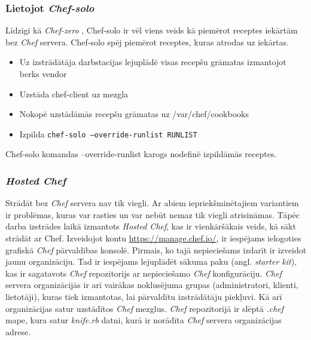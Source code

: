 \subsubsection{Lietojot \textit{Chef-solo}}
Līdzīgi kā \textit{Chef-zero} , Chef-solo ir vēl viens veids kā piemērot receptes iekārtām bez \textit{Chef} servera. Chef-solo spēj piemērot receptes, kuras atrodas uz iekārtas.
\begin{itemize}
	\item Uz izstrādātāja darbstacijas lejuplādē visas recepšu grāmatas izmantojot berks vendor
	\item Uzstāda chef-client uz mezgla
	\item Nokopē uzstādāmās recepšu grāmatas uz /var/chef/cookbooks
	\item Izpilda \texttt{chef-solo --override-runlist RUNLIST}
\end{itemize}
Chef-solo komandas --override-runlist karogs nodefinē izpildāmās receptes.

\subsubsection{\textit{Hosted Chef}}
Strādāt bez \textit{Chef} servera nav tik viegli. Ar abiem iepriekšminētajiem variantiem ir problēmas, kuras var rasties un var nebūt nemaz tik viegli atrisināmas.
Tāpēc darba izstrādes laikā izmantots \textit{Hosted Chef}, kas ir vienkāršākais veids, kā sākt strādāt ar Chef.
Izveidojot kontu \url{https://manage.chef.io/}, ir iespējams ielogoties grafiskā \textit{Chef} pārvaldības konsolē.
Pirmais, ko tajā nepieciešams izdarīt ir izveidot jaunu organizāciju. Tad ir iespējams lejuplādēt sākuma paku (angl. \textit{starter kit}), kas ir sagatavots \textit{Chef} repozitorijs ar nepieciešamo \textit{Chef} konfigurāciju. \textit{Chef} servera organizācijās ir arī vairākas noklusējuma grupas (administratori, klienti, lietotāji), kuras tiek izmantotas, lai pārvaldītu izstrādātāju piekļuvi. Kā arī organizācijas satur uzstādītos \textit{Chef} mezglus. \textit{Chef} repozitorijā ir slēptā \textit{.chef} mape, kura satur \textit{knife.rb} datni, kurā ir norādīta \textit{Chef} servera organizācijas adrese.

